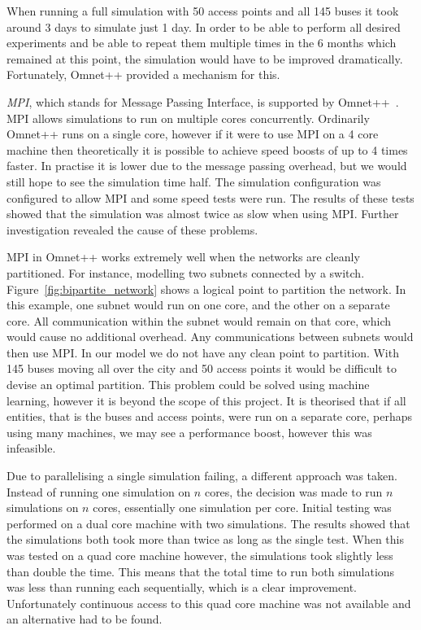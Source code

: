             When running a full simulation with 50 access points and all 145 buses it took around 3 days to simulate just 1 day. In order to be able to perform all desired experiments and be able to repeat them multiple times in the 6 months which remained at this point, the simulation would have to be improved dramatically. Fortunately, Omnet++ provided a mechanism for this. 

            \emph{MPI}, which stands for Message Passing Interface, is supported by Omnet++~\cite{omnetmpi}. MPI allows simulations to run on multiple cores concurrently. Ordinarily Omnet++ runs on a single core, however if it were to use MPI on a 4 core machine then theoretically it is possible to achieve speed boosts of up to 4 times faster. In practise it is lower due to the message passing overhead, but we would still hope to see the simulation time half. The simulation configuration was configured to allow MPI and some speed tests were run. The results of these tests showed that the simulation was almost twice as slow when using MPI. Further investigation revealed the cause of these problems. 

            

            MPI in Omnet++ works extremely well when the networks are cleanly partitioned. For instance, modelling two subnets connected by a switch. Figure~\ref{fig:bipartite_network} shows a logical point to partition the network. In this example, one subnet would run on one core, and the other on a separate core. All communication within the subnet would remain on that core, which would cause no additional overhead. Any communications between subnets would then use MPI. In our model we do not have any clean point to partition. With 145 buses moving all over the city and 50 access points it would be difficult to devise an optimal partition. This problem could be solved using machine learning, however it is beyond the scope of this project. It is theorised that if all entities, that is the buses and access points, were run on a separate core, perhaps using many machines, we may see a performance boost, however this was infeasible. 

            Due to parallelising a single simulation failing, a different approach was taken. Instead of running one simulation on $n$ cores, the decision was made to run $n$ simulations on $n$ cores, essentially one simulation per core. Initial testing was performed on a dual core machine with two simulations. The results showed that the simulations both took more than twice as long as the single test. When this was tested on a quad core machine however, the simulations took slightly less than double the time. This means that the total time to run both simulations was less than running each sequentially, which is a clear improvement. Unfortunately continuous access to this quad core machine was not available and an alternative had to be found. 

